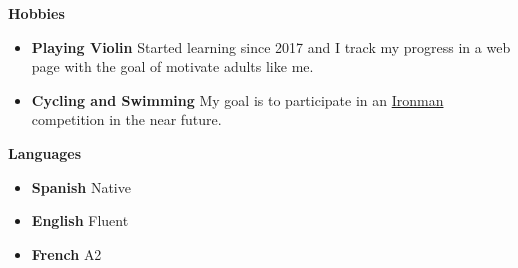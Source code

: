 \documentclass[letterpaper,12pt]{article}[leftmargin=*]
\def \entryspacing {-0pt}
\renewcommand{\section}[2]{\vspace{5pt}
  \colorbox{secondary}{\color{white}\raggedbottom\normalsize\textbf{{#1}{\hspace{7pt}#2}}}
}
\newcommand{\resumeEntryStart}{\begin{itemize}[leftmargin=2.5mm]}
\newcommand{\resumeEntryEnd}{\end{itemize}\vspace{\entryspacing}}
\newcommand{\resumeEntryS}[2]{
  \item[]\small{
    \textbf{\color{primary}#1 }{ #2 \vspace{-6pt}}
  }
}
\begin{document}

\section{\faGears}{Hobbies}
 \resumeEntryStart
  \resumeEntryS{Playing Violin} {Started learning since 2017 and I track my progress in a web page with the goal of motivate adults like me. \href{https://mattborghi.github.io/violin/}{\faGlobe}}
  \resumeEntryS{Cycling and Swimming} {My goal is to participate in an \href{https://www.ironman.com/}{Ironman} competition in the near future.}
 \resumeEntryEnd


\section{\faBook}{Languages}
 \resumeEntryStart
    \resumeEntryS {Spanish}{Native} 
    \resumeEntryS {English}{Fluent}
    \resumeEntryS {French}{A2}
 \resumeEntryEnd
\end{document}
